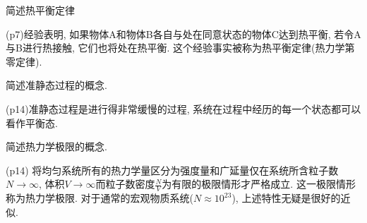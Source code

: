 \begin{questions}
  \question 简述热平衡定律
  \begin{solution}
    (p7)经验表明, 如果物体A和物体B各自与处在同意状态的物体C达到热平衡, 若令A与B进行热接触, 它们也将处在热平衡. 这个经验事实被称为热平衡定律(热力学第零定律).
  \end{solution}
  \question 简述准静态过程的概念.
  \begin{solution}
    (p14)准静态过程是进行得非常缓慢的过程, 系统在过程中经历的每一个状态都可以看作平衡态.
  \end{solution}
  \question 简述热力学极限的概念.
  \begin{solution}
    (p14) 将均匀系统所有的热力学量区分为强度量和广延量仅在系统所含粒子数$N\to\infty$, 体积$V\to\infty$而粒子数密度$\frac{N}{V}$为有限的极限情形才严格成立. 这一极限情形称为热力学极限. 对于通常的宏观物质系统($N\approx 10^{23}$), 上述特性无疑是很好的近似.
  \end{solution}
\end{questions}

